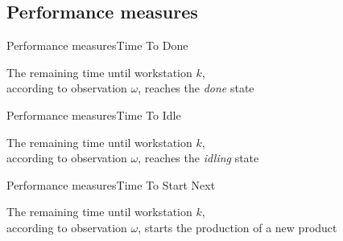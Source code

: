   \subsection{Performance measures}
    \begin{frame}{Performance measures}{Time To Done}
      \begin{center}
        The remaining time until workstation $k$,\\
        according to observation $\omega$, reaches the \textit{done} state
      \end{center}
      
      \vspace{1em}
      \begin{center}\scalebox{0.9}{}\end{center}
    \end{frame}
    
    \begin{frame}{Performance measures}{Time To Idle}
      \begin{center}
        The remaining time until workstation $k$,\\
        according to observation $\omega$, reaches the \textit{idling} state
      \end{center}
      
      \vspace{1em}
      \begin{center}\scalebox{0.9}{}\end{center}
    \end{frame}
    
    \begin{frame}{Performance measures}{Time To Start Next}
      \begin{center}
        The remaining time until workstation $k$,\\
        according to observation $\omega$, starts the production of a new product
      \end{center}
      
      \vspace{1em}
      \begin{center}\scalebox{0.9}{}\end{center}
    \end{frame}